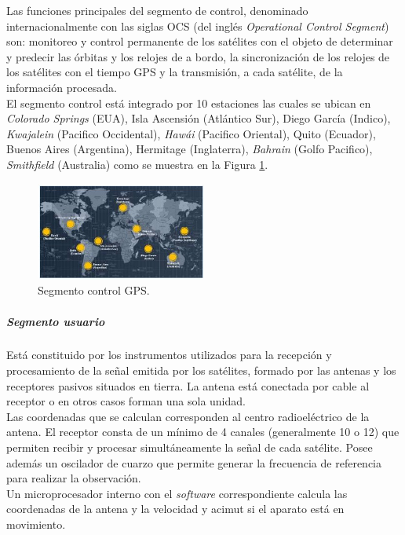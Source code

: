 Las funciones principales del segmento de control, denominado internacionalmente con las siglas OCS (del inglés \textit{Operational Control Segment}) son: monitoreo y control permanente de los satélites con el objeto de determinar y predecir las órbitas y los relojes de a bordo, la sincronización de los relojes de los satélites con el tiempo GPS y la transmisión, a cada satélite, de la información procesada.\\

El segmento control está integrado por 10 estaciones las cuales se ubican en \textit{Colorado Springs} (EUA), Isla Ascensión (Atlántico Sur), Diego García (Indico), \textit{Kwajalein} (Pacifico Occidental), \textit{Hawái} (Pacifico Oriental), Quito (Ecuador), Buenos Aires (Argentina), Hermitage (Inglaterra), \textit{Bahrain} (Golfo Pacifico), \textit{Smithfield} (Australia) como se muestra en la Figura \ref{Mseis}.


%
\begin{figure}[H]
\centering
\includegraphics[width=0.5\textwidth]{marco/fig7.jpg}
\caption{Segmento control GPS.}
\label{Mseis}
\end{figure}
%


\subparagraph{Segmento usuario}
Está constituido por los instrumentos utilizados para la recepción y procesamiento de la señal emitida por los satélites, formado por las antenas y los receptores pasivos situados en tierra. La antena está conectada por cable al receptor o en otros casos forman una sola unidad.\\

Las coordenadas que se calculan corresponden al centro radioeléctrico de la antena. El receptor consta de un mínimo de 4 canales (generalmente 10 o 12) que permiten recibir y procesar simultáneamente la señal de cada satélite. Posee además un oscilador de cuarzo que permite generar la frecuencia de referencia para realizar la observación. \\

Un microprocesador interno con el \textit{software} correspondiente calcula las coordenadas de la antena y la velocidad y acimut si el aparato está en movimiento.\\

